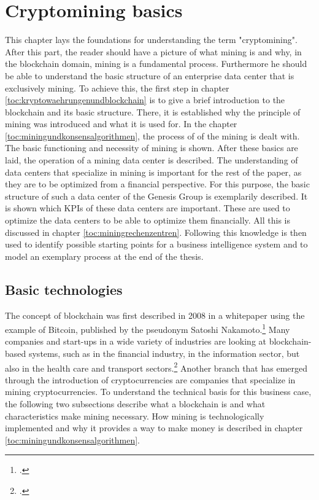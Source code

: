 \newpage
\section{Cryptomining basics} \label{toc:grundlagenkryptomining}


This chapter lays the foundations for understanding the term "cryptomining". After this part, the reader should
have a picture of what mining is and why, in the blockchain domain, mining is a fundamental process. Furthermore
he should be able to understand the basic structure of an enterprise data center that is exclusively mining.
To achieve this, the first step in chapter \ref{toc:kryptowaehrungenundblockchain} is to give a brief
introduction to the blockchain and its basic structure. There, it is established why the principle of
mining was introduced and what it is used for. In the chapter \ref{toc:miningundkonsensalgorithmen}, the process of
of the mining is dealt with. The basic functioning and necessity of mining is shown. After
these basics are laid, the operation of a mining data center is described. The understanding of
data centers that specialize in mining is important for the rest of the paper, as they are to be optimized from a financial perspective.
For this purpose, the basic structure of such a data center of the Genesis Group is exemplarily
described. It is shown which \acp{KPI} of these data centers are important. These are used to optimize the
data centers to be able to optimize them financially. All this is discussed in chapter \ref{toc:miningrechenzentren}. Following
this knowledge is then used to identify possible starting points for a business intelligence system
and to model an exemplary process at the end of the thesis.

\subsection{Basic technologies} \label{toc:technologie}

The concept of blockchain was first described in 2008 in a whitepaper using the example of Bitcoin,
published by the pseudonym Satoshi Nakamoto.\footcite[Cf.][]{nakamoto2008bitcoin} Many companies and start-ups in
a wide variety of industries are looking at blockchain-based
systems, such as in the financial industry, in the information sector, but also in the health care and
transport sectors.\footcite[Cf.][Chap. 4.1]{friedlmaier2018disrupting} Another branch that has emerged through the introduction of
cryptocurrencies are companies that specialize in mining cryptocurrencies. To understand the
technical basis for this business case, the following two subsections describe what
a blockchain is and what characteristics make mining necessary. How mining is technologically implemented and why
it provides a way to make money is described in chapter \ref{toc:miningundkonsensalgorithmen}.

